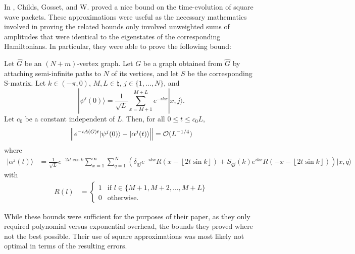 \documentclass[../thesis-main/thesis-main]{subfiles}
\begin{document}
In \cite{MPQW}, Childs, Gosset, and W. proved a nice bound on the time-evolution of square wave packets.  These approximations were useful as the necessary mathematics involved in proving the related bounds only involved unweighted sums of amplitudes that were identical to the eigenstates of the corresponding Hamiltonians.  In particular, they were able to prove the following bound:
\begin{theorem}
Let $\widehat{G}$ be an $(N+m)$-vertex graph. Let $G$ be a graph obtained from $\widehat{G}$ by attaching semi-infinite paths to $N$ of its vertices, and let $S$ be the corresponding S-matrix.  Let $k\in(-\pi,0)$, $M,L\in\natural$, $j\in\{1,\ldots,N\}$, and
\begin{equation}
  |\psi^{j}(0)\rangle=\frac{1}{\sqrt{L}}\sum_{x=M+1}^{M+L}e^{-ikx}|x,j\rangle.
\end{equation}
Let $c_{0}$ be a constant independent of $L$. Then, for all $0\leq t\leq c_{0}L$,
\begin{equation}
  \left\Vert e^{-iA(G) t}|\psi^{j}(0)\rangle-|\alpha^{j}(t)\rangle\right\Vert =\mathcal{O}(L^{-{1}/{4}})
\end{equation}
where 
\begin{align}
  |\alpha^{j}(t)\rangle & =  \frac{1}{\sqrt{L}}e^{-2it\cos k}\sum_{x=1}^{\infty}\sum_{q=1}^{N}\left(\delta_{qj} e^{-ikx}R(x-\left\lfloor 2t\sin k\right\rfloor)+S_{qj}(k)e^{ikx}R(-x-\left\lfloor 2t\sin k\right\rfloor)\right)|x,q\rangle
\end{align}
with
\begin{align}
R(l) & =  \begin{cases}
1 & \text{if }l\in\{M+1,M+2,\ldots,M+L\}\\
0 & \text{otherwise.}\end{cases}
\end{align}
\end{theorem}

While these bounds were sufficient for the purposes of their paper, as they only required polynomial versus exponential overhead, the bounds they proved where not the best possible.  Their use of square approximations was most likely not optimal in terms of the resulting errors.  
\end{document}
